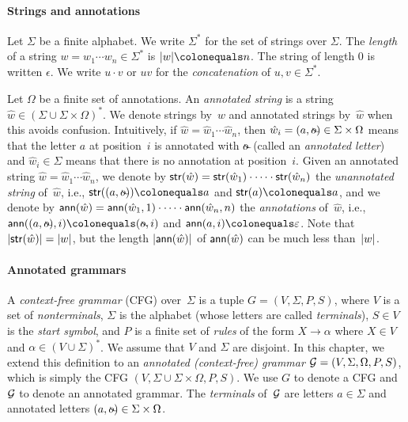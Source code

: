 %
%

%

\paragraph{Strings and annotations} Let $\Sigma$ be a finite alphabet.
We write $\Sigma^*$ for the set of strings
over $\Sigma$. The \emph{length} of a string $w = w_1 \cdots w_n \in
\Sigma^*$ is $|w| \colonequals n$. The string of length 0 is written
$\epsilon$. We write $u \cdot v$ or $uv$ for the \emph{concatenation} of $u, v \in \Sigma^*$.

Let $\Omega$ be a finite set of annotations. An
\emph{annotated string} is a string $\hat{w} \in  (\Sigma \cup \Sigma \times \Omega)^*$. 
We denote strings by~$w$ and annotated strings by~$\hat{w}$ when this avoids confusion. 
Intuitively, if $\hat{w} = \hat{w}_1 \cdots \hat{w}_n$, then $\hat{w}_i = (a, \oout) \in \Sigma \times \Omega$ means that the letter $a$ at position~$i$ is annotated with $\oout$ (called an \emph{annotated letter}) and $\hat{w}_i \in \Sigma$ means that there is no annotation at position~$i$. 
Given an annotated string $\hat{w} = \hat{w}_1 \cdots \hat{w}_n$, we denote by
$\mathsf{str}(\hat{w}) = \mathsf{str}(\hat{w}_1) \cdot
\cdots \cdot \mathsf{str}(\hat{w}_n)$ the \emph{unannotated string} of~$\hat{w}$, i.e., $\str((a,
\oout)) \colonequals a$ and $\str(a) \colonequals a$, and we denote by
$\textsf{ann}(\hat{w}) = \textsf{ann}(\hat{w}_1, 1) \cdot \cdots \cdot \textsf{ann}( \hat{w}_n, n)$
the \emph{annotations} of~$\hat{w}$, i.e.,
$\ann((a, \oout), i) \colonequals (\oout, i)$ and $\ann(a, i) \colonequals
\epsilon$.
%
Note that $\left|\mathsf{str}(\hat{w})\right| = \left|w\right|$, but the length
$\left|\textsf{ann}(\hat{w})\right|$ of $\textsf{ann}(\hat{w})$ can be
much less than~$\left|w\right|$.
%
%
%

%
%
%
%
%
%

%
%

\paragraph{Annotated grammars} 
A \emph{context-free grammar} (CFG) over~$\Sigma$ is a tuple $G = (V, \Sigma, P,
S)$, where $V$ is a set of \emph{nonterminals}, $\Sigma$ is the alphabet (whose
letters are called \emph{terminals}),
$S \in V$ is the \emph{start symbol}, and $P$ is a finite set of \emph{rules} of the form $X \to \alpha$
where $X \in V$ and $\alpha \in (V \cup \Sigma)^*$. We assume that $V$ and
$\Sigma$ are disjoint. In this chapter, we extend this definition to an
\emph{annotated (context-free) grammar} $\mathcal{G} = (V, \Sigma, \Omega, P, S)$, which
is simply the CFG $(V, \Sigma \cup \Sigma \times \Omega, P, S)$.
%
%
%
%
%
%
We use $G$ to denote a CFG and $\mathcal{G}$ to denote an annotated grammar.
The \emph{terminals} of~$\mathcal{G}$ are letters $a \in \Sigma$ and annotated letters $(a, \oout) \in \Sigma \times \Omega$. 

